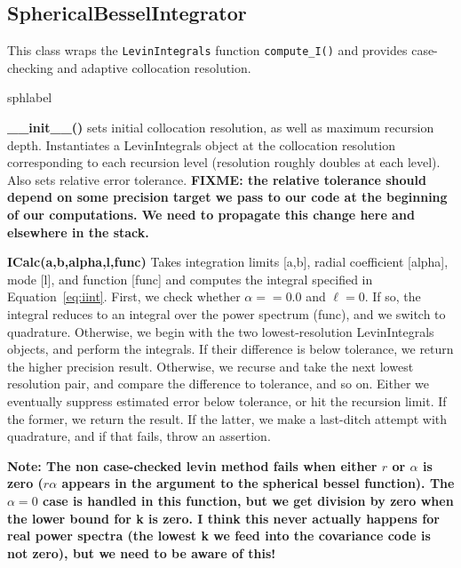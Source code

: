 \documentclass[10pt,a4paper]{article}
\begin{document}
\subsection{SphericalBesselIntegrator}
This class wraps the \verb|LevinIntegrals| function \verb|compute_I()| and provides case-checking and adaptive collocation resolution. 
\begin{labeling}{sphlabel}
	\item[\textbf{\_\_init\_\_()}] sets initial collocation resolution, as well as maximum recursion depth. Instantiates a LevinIntegrals object at the collocation resolution corresponding to each recursion level (resolution roughly doubles at each level). Also sets relative error tolerance. \textbf{FIXME: the relative tolerance should depend on some precision target we pass to our code at the beginning of our computations. We need to propagate this change here and elsewhere in the stack.}
	
	\item[\textbf{ICalc(a,b,alpha,l,func)}] Takes integration limits [a,b], radial coefficient [alpha], mode [l], and function [func] and computes the integral specified in Equation~\eqref{eq:iint}. First, we check whether $\alpha==0.0$ and $\ell=0$. If so, the integral reduces to an integral over the power spectrum (func), and we switch to quadrature. Otherwise, we begin with the two lowest-resolution LevinIntegrals objects, and perform the integrals. If their difference is below tolerance, we return the higher precision result. Otherwise, we recurse and take the next lowest resolution pair, and compare the difference to tolerance, and so on. Either we eventually suppress estimated error below tolerance, or hit the recursion limit. If the former, we return the result. If the latter, we make a last-ditch attempt with quadrature, and if that fails, throw an assertion.
	
	\textbf{Note: The non case-checked levin method fails when either $r$ or $\alpha$ is zero ($r\alpha$ appears in the argument to the spherical bessel function). The $\alpha=0$ case is handled in this function, but we get division by zero when the lower bound for k is zero. I think this never actually happens for real power spectra (the lowest k we feed into the covariance code is not zero), but we need to be aware of this!}
	

\end{labeling}
\end{document}
